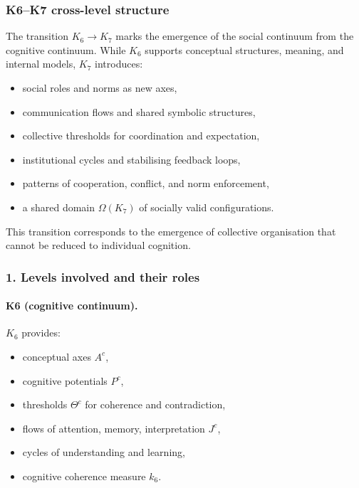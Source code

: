 
\subsubsection{K6–K7 cross-level structure}
\label{sec:crossk-k6-k7}

The transition $K_6 \rightarrow K_7$ marks the emergence of the social
continuum from the cognitive continuum. While $K_6$ supports conceptual
structures, meaning, and internal models, $K_7$ introduces:
\begin{itemize}
  \item social roles and norms as new axes,
  \item communication flows and shared symbolic structures,
  \item collective thresholds for coordination and expectation,
  \item institutional cycles and stabilising feedback loops,
  \item patterns of cooperation, conflict, and norm enforcement,
  \item a shared domain $\Omega(K_7)$ of socially valid configurations.
\end{itemize}

This transition corresponds to the emergence of collective organisation
that cannot be reduced to individual cognition.

\subsubsection{1. Levels involved and their roles}

\paragraph{K6 (cognitive continuum).}
$K_6$ provides:
\begin{itemize}
  \item conceptual axes $A^{c}$,
  \item cognitive potentials $P^{c}$,
  \item thresholds $\Theta^{c}$ for coherence and contradiction,
  \item flows of attention, memory, interpretation $J^{c}$,
  \item cycles of understanding and learning,
  \item cognitive coherence measure $k_6$.
\end{itemize}

